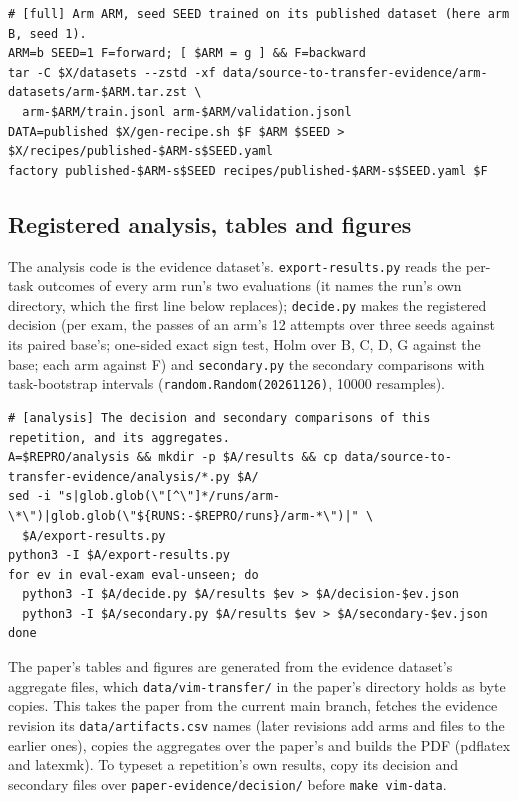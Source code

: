 {\scriptsize
\begin{verbatim}
# [full] Arm ARM, seed SEED trained on its published dataset (here arm B, seed 1).
ARM=b SEED=1 F=forward; [ $ARM = g ] && F=backward
tar -C $X/datasets --zstd -xf data/source-to-transfer-evidence/arm-datasets/arm-$ARM.tar.zst \
  arm-$ARM/train.jsonl arm-$ARM/validation.jsonl
DATA=published $X/gen-recipe.sh $F $ARM $SEED > $X/recipes/published-$ARM-s$SEED.yaml
factory published-$ARM-s$SEED recipes/published-$ARM-s$SEED.yaml $F
\end{verbatim}
}

\subsection{Registered analysis, tables and figures}\label{app:repro-vim-analysis}

\begin{sloppypar}
The analysis code is the evidence dataset's. \texttt{export-results.py} reads the per-task outcomes of every arm run's two
evaluations (it names the run's own directory, which the first line below replaces); \texttt{decide.py} makes the registered
decision (per exam, the passes of an arm's 12 attempts over three seeds against its paired base's; one-sided exact sign test,
Holm over B, C, D, G against the base; each arm against F) and \texttt{secondary.py} the secondary comparisons with
task-bootstrap intervals (\texttt{random.Random(20261126)}, 10000 resamples).
\end{sloppypar}

{\scriptsize
\begin{verbatim}
# [analysis] The decision and secondary comparisons of this repetition, and its aggregates.
A=$REPRO/analysis && mkdir -p $A/results && cp data/source-to-transfer-evidence/analysis/*.py $A/
sed -i "s|glob.glob(\"[^\"]*/runs/arm-\*\")|glob.glob(\"${RUNS:-$REPRO/runs}/arm-*\")|" \
  $A/export-results.py
python3 -I $A/export-results.py
for ev in eval-exam eval-unseen; do
  python3 -I $A/decide.py $A/results $ev > $A/decision-$ev.json
  python3 -I $A/secondary.py $A/results $ev > $A/secondary-$ev.json
done
\end{verbatim}
}

\begin{sloppypar}
The paper's tables and figures are generated from the evidence dataset's aggregate files, which \texttt{data/vim-transfer/} in
the paper's directory holds as byte copies. This takes the paper from the current main branch, fetches the evidence revision
its \texttt{data/artifacts.csv} names (later revisions add arms and files to the earlier ones), copies the aggregates over the paper's
and builds the PDF (pdflatex and latexmk). To typeset a repetition's own results, copy its decision and secondary files over
\texttt{paper-evidence/decision/} before \texttt{make vim-data}.
\end{sloppypar}

